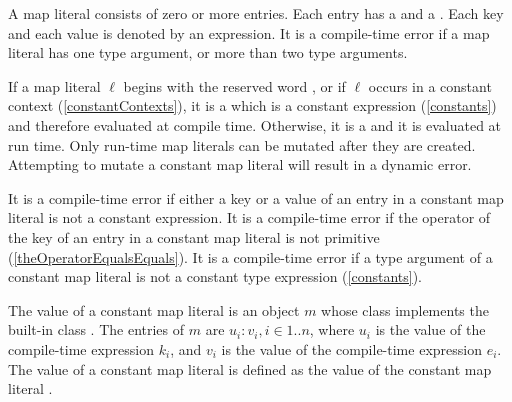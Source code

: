 \documentclass[makeidx]{article}
\begin{document}
{\LMHash{}%
A map literal consists of zero or more entries.
Each entry has a  and a .
Each key and each value is denoted by an expression.
It is a compile-time error if a map literal has one type argument,
or more than two type arguments.

\LMHash{}%
If a map literal $\ell$ begins with the reserved word \CONST{},
or if $\ell$ occurs in a constant context
(\ref{constantContexts}),
it is a
which is a constant expression
(\ref{constants})
and therefore evaluated at compile time.
Otherwise, it is a
and it is evaluated at run time.
Only run-time map literals can be mutated after they are created.
Attempting to mutate a constant map literal will result in a dynamic error.


\LMHash{}%
It is a compile-time error if
either a key or a value of an entry in a constant map literal
is not a constant expression.
It is a compile-time error if
the operator \lit{==} of the key of an entry in a constant map literal
is not primitive
(\ref{theOperatorEqualsEquals}).
It is a compile-time error if a type argument of a constant map literal
is not a constant type expression
(\ref{constants}).

\LMHash{}%
The value of a constant map literal
is an object $m$ whose class implements the built-in class
.
The entries of $m$ are $u_i:v_i, i \in 1 .. n$,
where $u_i$ is the value of the compile-time expression $k_i$,
and $v_i$ is the value of the compile-time expression $e_i$.
%
The value of a constant map literal
is defined as the value of the constant map literal
.

}
\end{document}

